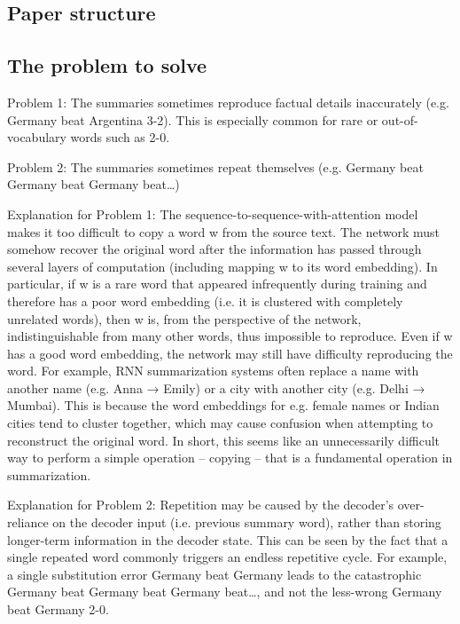 \documentclass[UTF8]{ctexart}
\begin{document}
    \subsection{Paper structure}



    \subsection{The problem to solve}

    Problem 1: The summaries sometimes reproduce factual details inaccurately (e.g. Germany beat Argentina 3-2). This is especially common for rare or out-of-vocabulary words such as 2-0.

    Problem 2: The summaries sometimes repeat themselves (e.g. Germany beat Germany beat Germany beat…)

    Explanation for Problem 1: The sequence-to-sequence-with-attention model makes it too difficult to copy a word w from the source text. The network must somehow recover the original word after the information has passed through several layers of computation (including mapping w to its word embedding).
In particular, if w is a rare word that appeared infrequently during training and therefore has a poor word embedding (i.e. it is clustered with completely unrelated words), then w is, from the perspective of the network, indistinguishable from many other words, thus impossible to reproduce.
Even if w has a good word embedding, the network may still have difficulty reproducing the word. For example, RNN summarization systems often replace a name with another name (e.g. Anna → Emily) or a city with another city (e.g. Delhi → Mumbai). This is because the word embeddings for e.g. female names or Indian cities tend to cluster together, which may cause confusion when attempting to reconstruct the original word.
In short, this seems like an unnecessarily difficult way to perform a simple operation – copying – that is a fundamental operation in summarization.

Explanation for Problem 2: Repetition may be caused by the decoder’s over-reliance on the decoder input (i.e. previous summary word), rather than storing longer-term information in the decoder state. This can be seen by the fact that a single repeated word commonly triggers an endless repetitive cycle. For example, a single substitution error Germany beat Germany leads to the catastrophic Germany beat Germany beat Germany beat…, and not the less-wrong Germany beat Germany 2-0.
\end{document}

